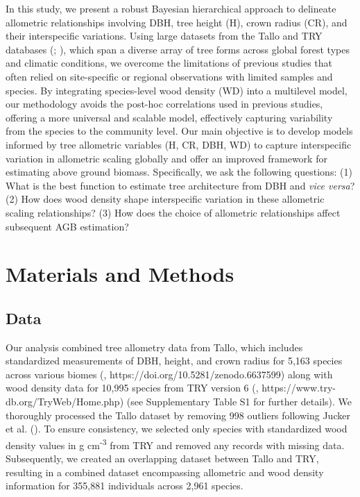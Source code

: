 \documentclass[
  12pt,
  letterpaper,
  DIV=11,
  numbers=noendperiod]{scrartcl}
\begin{document}
In this study, we present a robust Bayesian hierarchical approach to
delineate allometric relationships involving DBH, tree height (H), crown
radius (CR), and their interspecific variations. Using large datasets
from the Tallo and TRY databases (; ), which span a
diverse array of tree forms across global forest types and climatic
conditions, we overcome the limitations of previous studies that often
relied on site-specific or regional observations with limited samples
and species. By integrating species-level wood density (WD) into a
multilevel model, our methodology avoids the post-hoc correlations used
in previous studies, offering a more universal and scalable model,
effectively capturing variability from the species to the community
level. Our main objective is to develop models informed by tree
allometric variables (H, CR, DBH, WD) to capture interspecific variation
in allometric scaling globally and offer an improved framework for
estimating above ground biomass. Specifically, we ask the following
questions: (1) What is the best function to estimate tree architecture
from DBH and \emph{vice versa}? (2) How does wood density shape
interspecific variation in these allometric scaling relationships? (3)
How does the choice of allometric relationships affect subsequent AGB
estimation?

\section{Materials and Methods}\label{materials-and-methods}

\subsection{Data}\label{data}

Our analysis combined tree allometry data from Tallo, which includes
standardized measurements of DBH, height, and crown radius for 5,163
species across various biomes (, https://doi.org/10.5281/zenodo.6637599) along with wood density
data for 10,995 species from TRY version 6
(,
https://www.try-db.org/TryWeb/Home.php) (see Supplementary Table S1 for
further details). We thoroughly processed the Tallo dataset by removing
998 outliers following Jucker et al. ().
To ensure consistency, we selected only species with standardized wood
density values in g cm\textsuperscript{-3} from TRY and removed any
records with missing data. Subsequently, we created an overlapping
dataset between Tallo and TRY, resulting in a combined dataset
encompassing allometric and wood density information for 355,881
individuals across 2,961 species.
\end{document}
